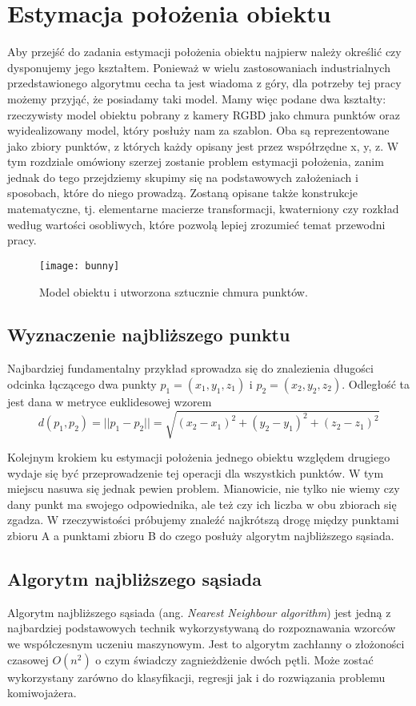 \documentclass{article}
\begin{document}
\newpage
\section{\LARGE{Estymacja położenia obiektu}}
Aby przejść do zadania estymacji położenia obiektu najpierw należy określić czy dysponujemy jego kształtem. Ponieważ w wielu zastosowaniach industrialnych przedstawionego algorytmu cecha ta jest wiadoma z góry, dla potrzeby tej pracy możemy przyjąć, że posiadamy taki model. Mamy więc podane dwa kształty: rzeczywisty model obiektu pobrany z kamery RGBD jako chmura punktów oraz wyidealizowany model, który posłuży nam za szablon. Oba są reprezentowane jako zbiory punktów, z których każdy opisany jest przez współrzędne x, y, z. W tym rozdziale omówiony szerzej zostanie problem estymacji położenia, zanim jednak do tego przejdziemy skupimy się na podstawowych założeniach i sposobach, które do niego prowadzą. Zostaną opisane także konstrukcje matematyczne, tj. elementarne macierze transformacji, kwaterniony czy rozkład według wartości osobliwych, które pozwolą lepiej zrozumieć temat przewodni pracy.

\begin{figure}[h]
\centering
\texttt{[image: bunny]}
\caption{Model obiektu i utworzona sztucznie chmura punktów.}
\end{figure}

\subsection{\LARGE{Wyznaczenie najbliższego punktu}}

Najbardziej fundamentalny przykład sprowadza się do znalezienia długości odcinka łączącego dwa punkty $p_{1} = (x_{1}, y_{1}, z_{1})$ i $p_{2} = (x_{2}, y_{2}, z_{2})$. Odległość ta jest dana w metryce euklidesowej wzorem
\[d(p_{1}, p_{2}) = ||p_{1} - p_{2}|| = \sqrt{(x_{2}-x_{1})^2+(y_{2}-y_{1})^2+(z_{2}-z_{1})^2}\]

Kolejnym krokiem ku estymacji położenia jednego obiektu względem drugiego wydaje się być przeprowadzenie tej operacji dla wszystkich punktów. W tym miejscu nasuwa się jednak pewien problem. Mianowicie, nie tylko nie wiemy czy dany punkt ma swojego odpowiednika, ale też czy ich liczba w obu zbiorach się zgadza. W rzeczywistości próbujemy znaleźć najkrótszą drogę między punktami zbioru A a punktami zbioru B do czego posłuży algorytm najbliższego sąsiada.

\subsection{\LARGE{Algorytm najbliższego sąsiada}}
Algorytm najbliższego sąsiada (ang. \emph{Nearest Neighbour algorithm}) jest jedną z najbardziej podstawowych technik wykorzystywaną do rozpoznawania wzorców we współczesnym uczeniu maszynowym. Jest to algorytm zachłanny o złożoności czasowej $O(n^2)$ o czym świadczy zagnieżdżenie dwóch pętli. Może zostać wykorzystany zarówno do klasyfikacji, regresji jak i do rozwiązania problemu komiwojażera. 
\end{document}
